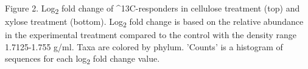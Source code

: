 Figure 2.  Log\textsubscript{2} fold change of ^{13}C-responders in cellulose treatment (top) and xylose treatment (bottom).  Log\textsubscript{2} fold change is based on the relative abundance in the experimental treatment compared to the control with the density range 1.7125-1.755 g/ml. Taxa are colored by phylum. 'Counts' is a histogram of sequences for each log\textsubscript{2} fold change value.    